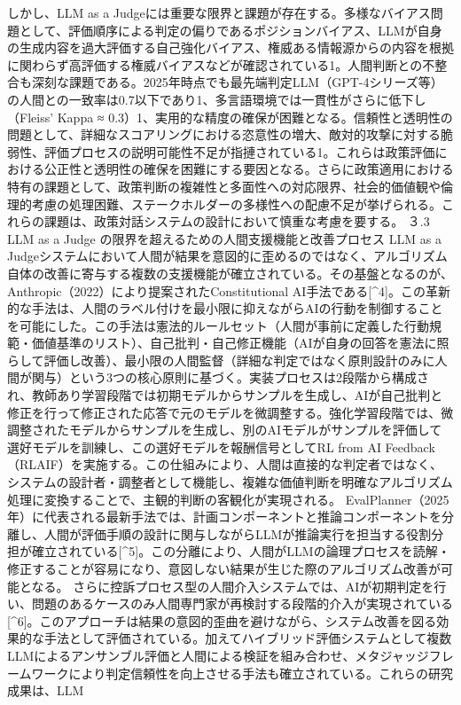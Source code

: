 しかし、LLM as a
Judgeには重要な限界と課題が存在する。多様なバイアス問題として、評価順序による判定の偏りであるポジションバイアス、LLMが自身の生成内容を過大評価する自己強化バイアス、権威ある情報源からの内容を根拠に関わらず高評価する権威バイアスなどが確認されている1。人間判断との不整合も深刻な課題である。2025年時点でも最先端判定LLM（GPT-4シリーズ等）の人間との一致率は0.7以下であり1、多言語環境では一貫性がさらに低下し（Fleiss'
Kappa ≈
0.3）1、実用的な精度の確保が困難となる。信頼性と透明性の問題として、詳細なスコアリングにおける恣意性の増大、敵対的攻撃に対する脆弱性、評価プロセスの説明可能性不足が指摙されている1。これらは政策評価における公正性と透明性の確保を困難にする要因となる。さらに政策適用における特有の課題として、政策判断の複雑性と多面性への対応限界、社会的価値観や倫理的考慮の処理困難、ステークホルダーの多様性への配慮不足が挙げられる。これらの課題は、政策対話システムの設計において慎重な考慮を要する。
３.3 LLM as a Judge の限界を超えるための人間支援機能と改善プロセス LLM
as a
Judgeシステムにおいて人間が結果を意図的に歪めるのではなく、アルゴリズム自体の改善に寄与する複数の支援機能が確立されている。その基盤となるのが、Anthropic（2022）により提案されたConstitutional
AI手法である{[}\^{}4{]}。この革新的な手法は、人間のラベル付けを最小限に抑えながらAIの行動を制御することを可能にした。この手法は憲法的ルールセット（人間が事前に定義した行動規範・価値基準のリスト）、自己批判・自己修正機能（AIが自身の回答を憲法に照らして評価し改善）、最小限の人間監督（詳細な判定ではなく原則設計のみに人間が関与）という3つの核心原則に基づく。実装プロセスは2段階から構成され、教師あり学習段階では初期モデルからサンプルを生成し、AIが自己批判と修正を行って修正された応答で元のモデルを微調整する。強化学習段階では、微調整されたモデルからサンプルを生成し、別のAIモデルがサンプルを評価して選好モデルを訓練し、この選好モデルを報酬信号としてRL
from AI
Feedback（RLAIF）を実施する。この仕組みにより、人間は直接的な判定者ではなく、システムの設計者・調整者として機能し、複雑な価値判断を明確なアルゴリズム処理に変換することで、主観的判断の客観化が実現される。
EvalPlanner（2025年）に代表される最新手法では、計画コンポーネントと推論コンポーネントを分離し、人間が評価手順の設計に関与しながらLLMが推論実行を担当する役割分担が確立されている{[}\^{}5{]}。この分離により、人間がLLMの論理プロセスを読解・修正することが容易になり、意図しない結果が生じた際のアルゴリズム改善が可能となる。
さらに控訴プロセス型の人間介入システムでは、AIが初期判定を行い、問題のあるケースのみ人間専門家が再検討する段階的介入が実現されている{[}\^{}6{]}。このアプローチは結果の意図的歪曲を避けながら、システム改善を図る効果的な手法として評価されている。加えてハイブリッド評価システムとして複数LLMによるアンサンブル評価と人間による検証を組み合わせ、メタジャッジフレームワークにより判定信頼性を向上させる手法も確立されている。これらの研究成果は、LLM
